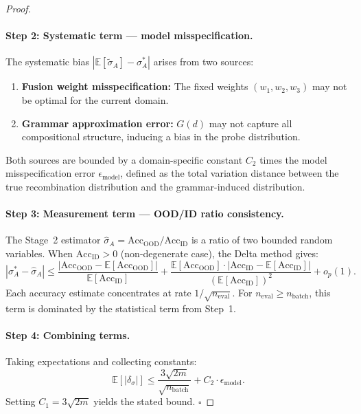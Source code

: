 \begin{proof}
\paragraph{Step 2: Systematic term — model misspecification.}
The systematic bias $|\mathbb{E}[\tilde{\sigma}_A] - \sigma_A^*|$ arises
from two sources:
\begin{enumerate}[nosep]
\item \textbf{Fusion weight misspecification:} The fixed weights
  $(w_1, w_2, w_3)$ may not be optimal for the current domain.
\item \textbf{Grammar approximation error:} $G(d)$ may not capture all
  compositional structure, inducing a bias in the probe distribution.
\end{enumerate}
Both sources are bounded by a domain-specific constant $C_2$ times
the model misspecification error $\epsilon_{\text{model}}$, defined as
the total variation distance between the true recombination distribution
and the grammar-induced distribution.

\paragraph{Step 3: Measurement term — OOD/ID ratio consistency.}
The Stage~2 estimator $\hat{\sigma}_A = \text{Acc}_{\text{OOD}} /
\text{Acc}_{\text{ID}}$ is a ratio of two bounded random variables.
When $\text{Acc}_{\text{ID}} > 0$ (non-degenerate case), the Delta
method gives:
\[
|\sigma_A^* - \hat{\sigma}_A| \leq \frac{|\text{Acc}_{\text{OOD}} - \mathbb{E}[\text{Acc}_{\text{OOD}}]|}{\mathbb{E}[\text{Acc}_{\text{ID}}]}
+ \frac{\mathbb{E}[\text{Acc}_{\text{OOD}}] \cdot |\text{Acc}_{\text{ID}} - \mathbb{E}[\text{Acc}_{\text{ID}}]|}{(\mathbb{E}[\text{Acc}_{\text{ID}}])^2} + o_p(1).
\]
Each accuracy estimate concentrates at rate $1/\sqrt{n_{\text{eval}}}$.
For $n_{\text{eval}} \geq n_{\text{batch}}$, this term is dominated by
the statistical term from Step~1.

\paragraph{Step 4: Combining terms.}
Taking expectations and collecting constants:
\[
\mathbb{E}[|\delta_\sigma|] \leq \frac{3\sqrt{2m}}{\sqrt{n_{\text{batch}}}}
+ C_2 \cdot \epsilon_{\text{model}}.
\]
Setting $C_1 = 3\sqrt{2m}$ yields the stated bound.
$\square$
\end{proof}

